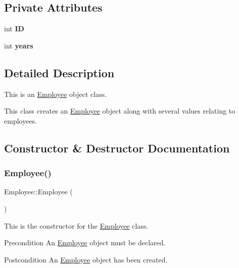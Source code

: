 \subsection*{Private Attributes}
\begin{DoxyCompactItemize}
\item 
\mbox{\label{classEmployee_a832bbae4ee8a704b917f82c4d497bbac}} 
int {\bfseries ID}
\item 
\mbox{\label{classEmployee_a3e4862d9dfc73becb459a562fa2e25f5}} 
int {\bfseries years}
\end{DoxyCompactItemize}


\subsection{Detailed Description}
This is an \hyperlink{classEmployee}{Employee} object class. 

This class creates an \hyperlink{classEmployee}{Employee} object along with several values relating to employees. 

\subsection{Constructor \& Destructor Documentation}
\mbox{\label{classEmployee_a003c7bd08c40924e381eb0750cbb906f}} 
\subsubsection{\texorpdfstring{Employee()}{Employee()}\hspace{0.1cm}{\footnotesize\ttfamily [1/2]}}
{\footnotesize\ttfamily Employee\+::\+Employee (\begin{DoxyParamCaption}{ }\end{DoxyParamCaption})}

This is the constructor for the \hyperlink{classEmployee}{Employee} class.

\begin{DoxyPrecond}{Precondition}
An \hyperlink{classEmployee}{Employee} object must be declared. 
\end{DoxyPrecond}
\begin{DoxyPostcond}{Postcondition}
An \hyperlink{classEmployee}{Employee} object has been created. 
\end{DoxyPostcond}
\mbox{\label{classEmployee_ad0c935ef9a290a82dcf7865172c90148}} 
